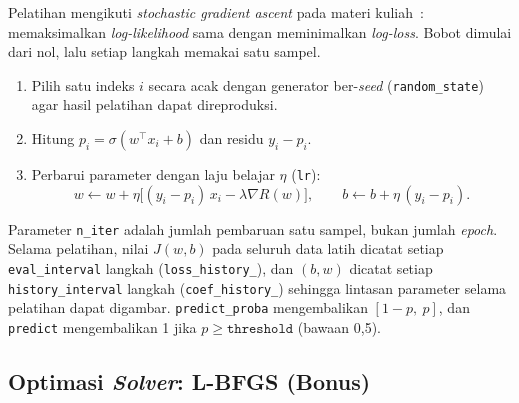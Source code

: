 Pelatihan mengikuti \textit{stochastic gradient ascent} pada materi
kuliah~\cite{khodra2021lrsga}: memaksimalkan \textit{log-likelihood} sama dengan
meminimalkan \textit{log-loss}. Bobot dimulai dari nol, lalu setiap langkah
memakai satu sampel.
\begin{enumerate}
	\item Pilih satu indeks $i$ secara acak dengan generator ber-\textit{seed}
	(\texttt{random\_state}) agar hasil pelatihan dapat direproduksi.
	\item Hitung $p_i=\sigma(w^\top x_i+b)$ dan residu $y_i-p_i$.
	\item Perbarui parameter dengan laju belajar $\eta$ (\texttt{lr}):
	\begin{equation}
		w\leftarrow w+\eta\bigl[(y_i-p_i)\,x_i-\lambda\nabla R(w)\bigr],\qquad
		b\leftarrow b+\eta\,(y_i-p_i).
	\end{equation}
\end{enumerate}
Parameter \texttt{n\_iter} adalah jumlah pembaruan satu sampel, bukan jumlah
\textit{epoch}. Selama pelatihan, nilai $J(w,b)$ pada seluruh data latih dicatat
setiap \texttt{eval\_interval} langkah (\texttt{loss\_history\_}), dan
$(b,w)$ dicatat setiap \texttt{history\_interval} langkah
(\texttt{coef\_history\_}) sehingga lintasan parameter selama pelatihan dapat
digambar. \texttt{predict\_proba} mengembalikan $[1-p,\ p]$, dan \texttt{predict}
mengembalikan 1 jika $p\ge\texttt{threshold}$ (bawaan 0,5).







\subsection{Optimasi \textit{Solver}: L-BFGS (Bonus)}
\label{sec:lbfgs}

